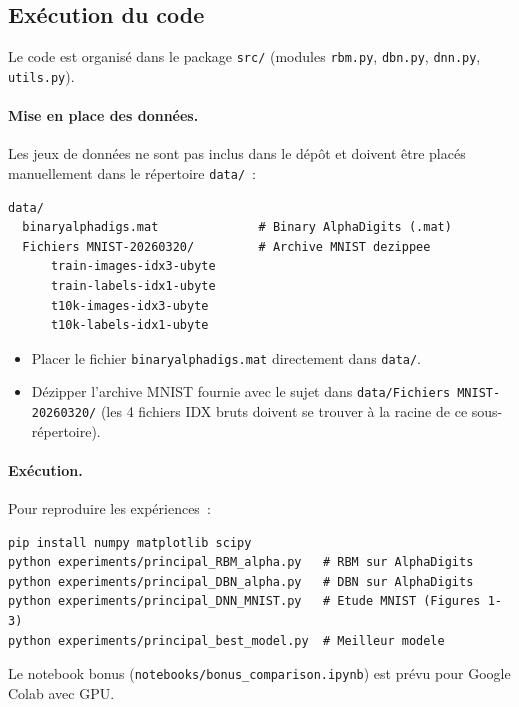 \documentclass[11pt,a4paper]{article}
\renewcommand{\texttt}[1]{\urlstyle{tt}\nolinkurl{#1}}
\begin{document}
\subsection{Ex\'ecution du code}

Le code est organis\'e dans le package \texttt{src/} (modules \texttt{rbm.py}, \texttt{dbn.py}, \texttt{dnn.py}, \texttt{utils.py}).

\paragraph{Mise en place des donn\'ees.}
Les jeux de donn\'ees ne sont pas inclus dans le d\'ep\^ot et doivent \^etre plac\'es manuellement dans le r\'epertoire \texttt{data/}~:

\begin{lstlisting}
data/
  binaryalphadigs.mat              # Binary AlphaDigits (.mat)
  Fichiers MNIST-20260320/         # Archive MNIST dezippee
      train-images-idx3-ubyte
      train-labels-idx1-ubyte
      t10k-images-idx3-ubyte
      t10k-labels-idx1-ubyte
\end{lstlisting}

\begin{itemize}
    \item Placer le fichier \texttt{binaryalphadigs.mat} directement dans \texttt{data/}.
    \item D\'ezipper l'archive MNIST fournie avec le sujet dans \texttt{data/Fichiers MNIST-20260320/} (les 4 fichiers IDX bruts doivent se trouver \`a la racine de ce sous-r\'epertoire).
\end{itemize}

\paragraph{Ex\'ecution.}
Pour reproduire les exp\'eriences~:

\begin{lstlisting}
pip install numpy matplotlib scipy
python experiments/principal_RBM_alpha.py   # RBM sur AlphaDigits
python experiments/principal_DBN_alpha.py   # DBN sur AlphaDigits
python experiments/principal_DNN_MNIST.py   # Etude MNIST (Figures 1-3)
python experiments/principal_best_model.py  # Meilleur modele
\end{lstlisting}

Le notebook bonus (\texttt{notebooks/bonus\_comparison.ipynb}) est pr\'evu pour Google Colab avec GPU.

\end{document}
